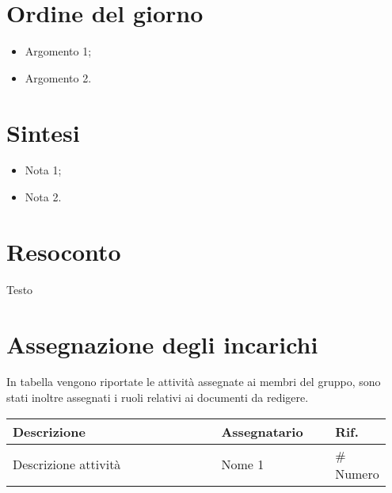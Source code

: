 \section{Ordine del giorno}
\begin{itemize}
    \item Argomento 1;
    \item Argomento 2.
\end{itemize}

\section{Sintesi}
\begin{itemize}
    \item Nota 1;
    \item Nota 2.
\end{itemize}

\section{Resoconto}
Testo

\section{Assegnazione degli incarichi}
In tabella vengono riportate le attività assegnate ai membri del gruppo, sono stati inoltre assegnati i ruoli relativi ai documenti da redigere.
\begin{center}
    {
    \renewcommand{\arraystretch}{1.5}
    \begin{tabular}{p{0.55\linewidth}p{0.30\linewidth}p{0.10\linewidth}}
        \textbf{Descrizione}    &   \textbf{Assegnatario}   & \textbf{Rif.}     \\
        \hline
        Descrizione attività    & Nome 1                    & \# Numero          \\
    \end{tabular}
    }
\end{center}